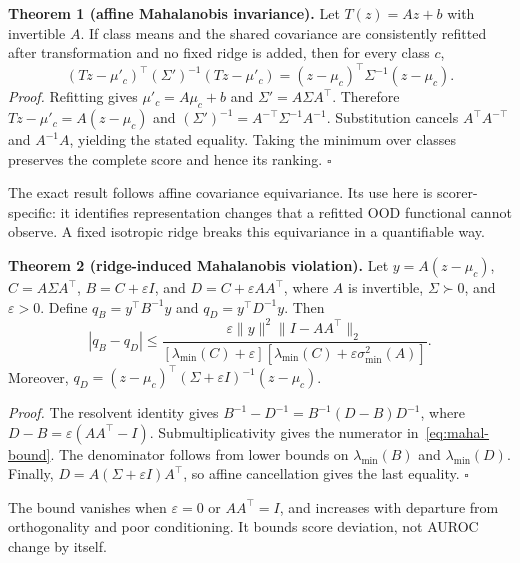 \documentclass[11pt,a4paper]{article}
\begin{document}
\textbf{Theorem 1 (affine Mahalanobis invariance).} Let $T(z)=Az+b$ with invertible $A$. If class means and the shared covariance are consistently refitted after transformation and no fixed ridge is added, then for every class $c$,
\begin{equation}
(Tz-\mu'_c)^\top(\Sigma')^{-1}(Tz-\mu'_c)
=(z-\mu_c)^\top\Sigma^{-1}(z-\mu_c).
\end{equation}
\emph{Proof.} Refitting gives $\mu'_c=A\mu_c+b$ and $\Sigma'=A\Sigma A^\top$. Therefore $Tz-\mu'_c=A(z-\mu_c)$ and $(\Sigma')^{-1}=A^{-\top}\Sigma^{-1}A^{-1}$. Substitution cancels $A^\top A^{-\top}$ and $A^{-1}A$, yielding the stated equality. Taking the minimum over classes preserves the complete score and hence its ranking. \hfill$\square$

The exact result follows affine covariance equivariance. Its use here is scorer-specific: it identifies representation changes that a refitted OOD functional cannot observe. A fixed isotropic ridge breaks this equivariance in a quantifiable way.

\textbf{Theorem 2 (ridge-induced Mahalanobis violation).} Let $y=A(z-\mu_c)$, $C=A\Sigma A^\top$, $B=C+\varepsilon I$, and $D=C+\varepsilon AA^\top$, where $A$ is invertible, $\Sigma\succ0$, and $\varepsilon>0$. Define $q_B=y^\top B^{-1}y$ and $q_D=y^\top D^{-1}y$. Then
\begin{equation}
|q_B-q_D|\le
\frac{\varepsilon\|y\|^2\|I-AA^\top\|_2}
{[\lambda_{\min}(C)+\varepsilon]
 [\lambda_{\min}(C)+\varepsilon\sigma_{\min}^2(A)]}.
\label{eq:mahal-bound}
\end{equation}
Moreover, $q_D=(z-\mu_c)^\top(\Sigma+\varepsilon I)^{-1}(z-\mu_c)$.

\emph{Proof.} The resolvent identity gives $B^{-1}-D^{-1}=B^{-1}(D-B)D^{-1}$, where $D-B=\varepsilon(AA^\top-I)$. Submultiplicativity gives the numerator in~\eqref{eq:mahal-bound}. The denominator follows from lower bounds on $\lambda_{\min}(B)$ and $\lambda_{\min}(D)$. Finally, $D=A(\Sigma+\varepsilon I)A^\top$, so affine cancellation gives the last equality. \hfill$\square$

The bound vanishes when $\varepsilon=0$ or $AA^\top=I$, and increases with departure from orthogonality and poor conditioning. It bounds score deviation, not AUROC change by itself.
\end{document}
